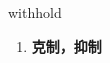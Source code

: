 
\begin{frame}
{\huge withhold}
\begin{center}
\begin{enumerate}\Large
  \item \textbf{克制，抑制}
\end{enumerate}
\end{center}
\end{frame}
